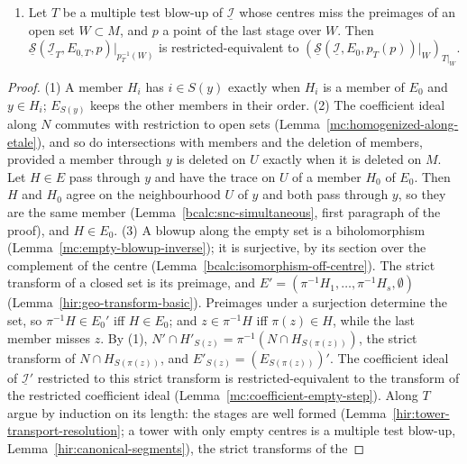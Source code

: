 \begin{lemma}
\begin{enumerate}
The same holds along a tower \(T\) with only empty centres: \(\underline{\mathcal S}(\underline{\mathcal I}_T,E_{0,T},z)\) is restricted-equivalent to
\(\underline{\mathcal S}(\underline{\mathcal I},E_0,p_T(z))_T\).
\item Let \(T\) be a multiple test blow-up of \(\underline{\mathcal I}\) whose centres miss the preimages of an open set \(W\subset M\), and \(p\) a point of the last
stage over \(W\). Then \(\underline{\mathcal S}(\underline{\mathcal I}_T,E_{0,T},p)|_{p_T^{-1}(W)}\) is restricted-equivalent to
\((\underline{\mathcal S}(\underline{\mathcal I},E_0,p_T(p))|_W)_{T|_W}\).
\end{enumerate}
\end{lemma}
\begin{proof}
\leanok
(1) A member \(H_i\) has \(i\in S(y)\) exactly when \(H_i\) is a member of \(E_0\) and \(y\in H_i\); \(E_{S(y)}\) keeps the other members in their order.
(2) The coefficient ideal along \(N\) commutes with restriction to open sets (Lemma~\ref{mc:homogenized-along-etale}), and so do intersections with members and
the deletion of members, provided a member through \(y\) is deleted on \(U\) exactly when it is deleted on \(M\). Let \(H\in E\) pass through \(y\) and have the
trace on \(U\) of a member \(H_0\) of \(E_0\). Then \(H\) and \(H_0\) agree on the neighbourhood \(U\) of \(y\) and both pass through \(y\), so they are the same
member (Lemma~\ref{bcalc:snc-simultaneous}, first paragraph of the proof), and \(H\in E_0\).
(3) A blowup along the empty set is a biholomorphism (Lemma~\ref{mc:empty-blowup-inverse}); it is surjective, by its section over the complement of the centre
(Lemma~\ref{bcalc:isomorphism-off-centre}). The strict transform of a closed set is its preimage, and \(E'=(\pi^{-1}H_1,\dots,\pi^{-1}H_s,\emptyset)\)
(Lemma~\ref{hir:geo-transform-basic}). Preimages under a surjection determine the set, so \(\pi^{-1}H\in E_0'\) iff \(H\in E_0\); and \(z\in\pi^{-1}H\) iff
\(\pi(z)\in H\), while the last member misses \(z\). By (1), \(N'\cap H'_{S(z)}=\pi^{-1}(N\cap H_{S(\pi(z))})\), the strict transform of \(N\cap H_{S(\pi(z))}\), and
\(E'_{S(z)}=(E_{S(\pi(z))})'\). The coefficient ideal of \(\underline{\mathcal I}'\) restricted to this strict transform is restricted-equivalent to the transform of the
restricted coefficient ideal (Lemma~\ref{mc:coefficient-empty-step}). Along \(T\) argue by induction on its length: the stages are well formed
(Lemma~\ref{hir:tower-transport-resolution}; a tower with only empty centres is a multiple test blow-up, Lemma~\ref{hir:canonical-segments}), the strict transforms of the

\end{proof}
